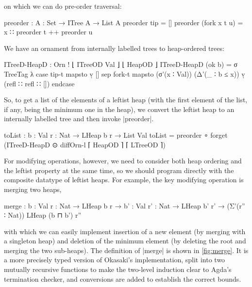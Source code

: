 on which we can do pre-order traversal:
\begin{code}
preorder : {A : Set} → ITree A → List A
preorder tip           =  []
preorder (fork x t u)  =  x ∷ preorder t ++ preorder u
\end{code}
We have an ornament from internally labelled trees to heap-ordered trees:
\begin{code}
ITreeD-HeapD : Orn ! ⌊ ITreeOD Val ⌋ ⌊ HeapOD ⌋
ITreeD-HeapD (ok b) =
  σ TreeTag λ  case  tip-t   mapsto  ṿ []
               sep   fork-t  mapsto  (σ'(x ∶ Val)) (Δ'(_ ∶ b ≤ x)) ṿ (refl ∷ refl ∷ []) endcase
\end{code}
So, to get a list of the elements of a leftist heap (with the first element of the list, if any, being the minimum one in the heap), we convert the leftist heap to an internally labelled tree and then invoke |preorder|.
\begin{code}
toList : {b : Val} {r : Nat} → LHeap b r → List Val
toList = preorder ∘ forget (ITreeD-HeapD ⊙ diffOrn-l ⌈ HeapOD ⌉ ⌈ LTreeOD ⌉)
\end{code}

For modifying operations, however, we need to consider both heap ordering and the leftist property at the same time, so we should program directly with the composite datatype of leftist heaps.
For example, the key modifying operation is merging two heaps,
\begin{code}
merge :  {b   : Val} {r   : Nat} → LHeap b   r   →
         {b'  : Val} {r'  : Nat} → LHeap b'  r'  → (Σ'(r'' ∶ Nat)) LHeap (b ⊓ b') r''
\end{code}
with which we can easily implement insertion of a new element (by merging with a singleton heap) and deletion of the minimum element (by deleting the root and merging the two sub-heaps).
The definition of |merge| is shown in \autoref{fig:merge}.
It is a more precisely typed version of Okasaki's implementation, split into two mutually recursive functions to make the two-level induction clear to Agda's termination checker, and conversions are added to establish the correct bounds.

